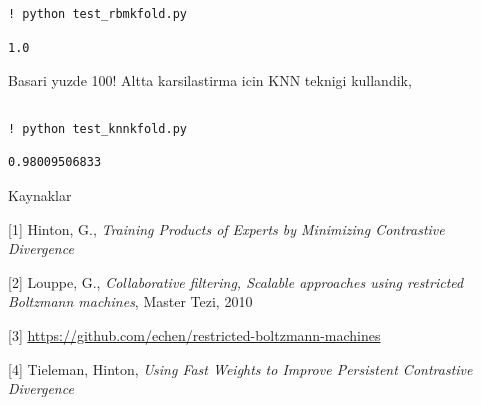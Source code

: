 \documentclass[12pt,fleqn]{article}\usepackage{../common}
\begin{document}
\begin{verbatim}
! python test_rbmkfold.py
\end{verbatim}

\begin{verbatim}
1.0
\end{verbatim}

Basari yuzde 100! Altta karsilastirma icin KNN teknigi kullandik,

\inputminted[fontsize=\footnotesize]{python}{test_knnkfold.py}

\begin{verbatim}
! python test_knnkfold.py
\end{verbatim}

\begin{verbatim}
0.98009506833
\end{verbatim}

Kaynaklar

[1] Hinton, G., {\em Training Products of Experts by Minimizing Contrastive
Divergence}

[2] Louppe, G., {\em Collaborative filtering, Scalable approaches using
restricted Boltzmann machines}, Master Tezi, 2010

[3] \url{https://github.com/echen/restricted-boltzmann-machines}

[4] Tieleman, Hinton, {\em Using Fast Weights to Improve Persistent Contrastive Divergence}
\end{document}
